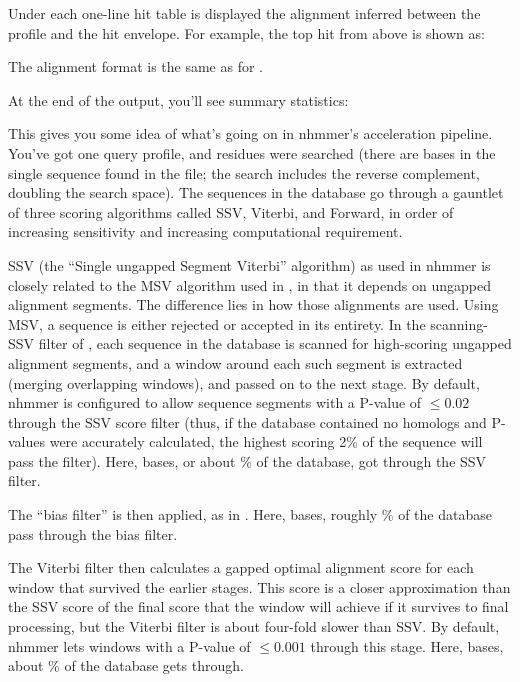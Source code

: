 Under each one-line hit table is displayed the alignment inferred
between the profile and the hit envelope. For example, the top hit
from above is shown as:


The alignment format is the same as for .

At the end of the output, you'll see summary statistics:


This gives you some idea of what's going on in nhmmer's acceleration
pipeline. You've got one query profile, and \NMHnres{} residues were
searched (there are \NMHntop{} bases in the single sequence found in
the file; the search includes the reverse complement, doubling the
search space). The sequences in the database go through a gauntlet of
three scoring algorithms called SSV, Viterbi, and Forward, in order of
increasing sensitivity and increasing computational requirement.

SSV (the ``Single ungapped Segment Viterbi'' algorithm) as used in
nhmmer is closely related to the MSV algorithm used in
, in that it depends on ungapped alignment
segments. The difference lies in how those alignments are used. Using
MSV, a sequence is either rejected or accepted in its entirety. In the
scanning-SSV filter of , each sequence in the database is
scanned for high-scoring ungapped alignment segments, and a window
around each such segment is extracted (merging overlapping windows),
and passed on to the next stage. By default, nhmmer is configured to
allow sequence segments with a P-value of $\leq 0.02$ through the SSV
score filter (thus, if the database contained no homologs and P-values
were accurately calculated, the highest scoring 2\% of the sequence
will pass the filter). Here, \NMHnssv{} bases,
or about \NMHfracssv{}\% of the database, got through the SSV filter.

The ``bias filter'' is then applied, as in . Here, 
\NMHnbias{} bases, roughly \NMHfracbias{}\% of the database
pass through the bias filter.

The Viterbi filter then calculates a gapped optimal alignment score
for each window that survived the earlier stages. This score is a
closer approximation than the SSV score of the final score that the
window will achieve if it survives to final processing, but the
Viterbi filter is about four-fold slower than SSV. By default, nhmmer
lets windows with a P-value of $\leq 0.001$ through this stage. Here,
\NMHnvit{} bases, about \NMHfracvit{}\% of the database gets through.

